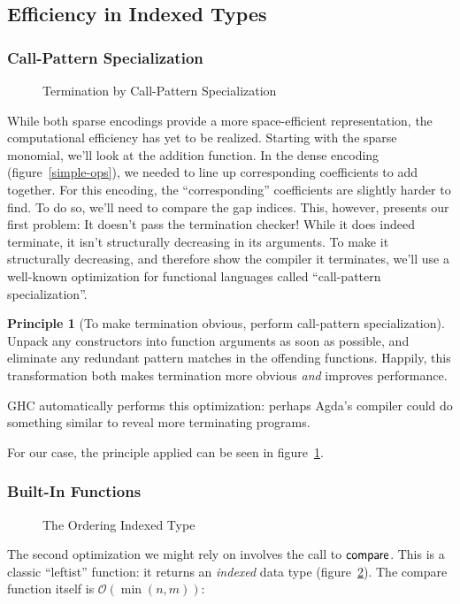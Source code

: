 \documentclass[draft, twocolumn]{article}
\theoremstyle{definition}
\theoremstyle{definition}
\newtheorem{principle}{Principle}[section]
\begin{document}
\subsection{Efficiency in Indexed Types} \label{efficient-cbc}
\subsubsection{Call-Pattern Specialization}
\begin{figure}
  \centering
  \caption{Termination by Call-Pattern Specialization}
  \label{term-add}
\end{figure}
While both sparse encodings provide a more space-efficient representation, the
computational efficiency has yet to be realized. Starting with the sparse
monomial, we'll look at the addition function. In the dense encoding
(figure~\ref{simple-ops}), we needed to line up corresponding coefficients to
add together. For this encoding, the ``corresponding'' coefficients are slightly
harder to find. To do so, we'll need to compare the gap indices. This, however,
presents our first problem:
It doesn't pass the termination checker! While it does indeed terminate, it
isn't structurally decreasing in its arguments. To make it structurally
decreasing, and therefore show the compiler it terminates, we'll use a
well-known optimization for functional languages called ``call-pattern
specialization''\cite{jones_call-pattern_2007}.
\begin{principle}[To make termination obvious, perform call-pattern
    specialization]
  Unpack any constructors into function arguments as soon as possible, and
  eliminate any redundant pattern matches in the offending functions. Happily,
  this transformation both makes termination more obvious \emph{and} improves
  performance.

  GHC automatically performs this optimization: perhaps Agda's compiler could do
  something similar to reveal more terminating programs.
\end{principle}

For our case, the principle applied can be seen in figure~\ref{term-add}.
\subsubsection{Built-In Functions}
\begin{figure}
  \caption{The Ordering Indexed Type}
  \label{ord-type}
\end{figure}
The second optimization we might rely on involves the call to
\(\AgdaFunction{compare}\). This is a classic ``leftist'' function: it returns
an \emph{indexed} data type (figure~\ref{ord-type}). The compare function itself
is \(\mathcal{O}(\min(n, m))\):
\end{document}
